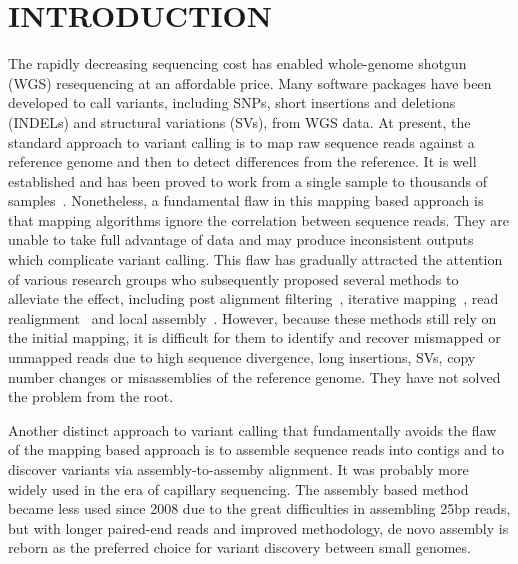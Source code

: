 \documentclass{bioinfo}
\begin{document}
\vspace*{-1em}

\section{INTRODUCTION}

The rapidly decreasing sequencing cost has enabled whole-genome shotgun (WGS)
resequencing at an affordable price. Many software packages have been developed
to call variants, including SNPs, short insertions and deletions (INDELs) and
structural variations (SVs), from WGS data. At present, the standard approach to
variant calling is to map raw sequence reads against a reference genome and then
to detect differences from the reference. It is well established and has been
proved to work from a single sample to thousands of
samples~\citep{1000-Genomes-Project-Consortium:2010qc}. Nonetheless, a
fundamental flaw in this mapping based approach is that mapping algorithms
ignore the correlation between sequence reads. They are unable to take full
advantage of data and may produce inconsistent outputs which complicate variant
calling.  This flaw has gradually attracted the attention of various research
groups who subsequently proposed several methods to alleviate the effect,
including post alignment
filtering~\citep{Ossowski:2008if,Krawitz:2010zr}, iterative
mapping~\citep{Manske:2009ve}, read
realignment~\citep{Albers:2010ud,Homer:2010kx,Li:2011kx,Depristo:2011vn} and
local assembly~\citep{Carnevali:2011fk}.  However, because these methods still
rely on the initial mapping, it is difficult for them to identify and recover
mismapped or unmapped reads due to high sequence divergence, long insertions,
SVs, copy number changes or misassemblies of the reference genome. They have
not solved the problem from the root.

Another distinct approach to variant calling that fundamentally avoids the flaw of the
mapping based approach is to assemble sequence reads into contigs and to
discover variants via assembly-to-assemby alignment. It was probably more
widely used in the era of capillary sequencing. The assembly based method
became less used since 2008 due to the great difficulties in assembling 25bp
reads, but with longer paired-end reads and improved methodology,
de novo assembly is reborn as the preferred choice for variant discovery
between small genomes.
\end{document}
